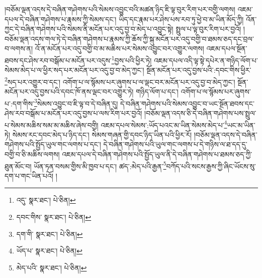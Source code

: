 །བཅོམ་ལྡན་འདས་དེ་བཞིན་གཤེགས་པའི་སེམས་འབྱུང་བའི་མཚན་ཉིད་ཇི་ལྟ་བུར་རིག་པར་བགྱི་ལགས། འཇམ་དཔལ་དེ་བཞིན་གཤེགས་པ་རྣམས་ཀྱི་སེམས་དང་། ཡིད་དང་རྣམ་པར་ཤེས་པས་རབ་ཏུ་ཕྱེ་བ་མ་ཡིན་མོད་ཀྱི། འོན་ཀྱང་དེ་བཞིན་གཤེགས་པའི་སེམས་ནི་མངོན་པར་འདུ་བྱ་བ་མེད་པ་འབྱུང་སྟེ། སྤྲུལ་པ་ལྟ་བུར་རིག་པར་བྱའོ། །བཅོམ་ལྡན་འདས་གལ་ཏེ་དེ་བཞིན་གཤེགས་པ་རྣམས་ཀྱི་ཆོས་ཀྱི་སྐུ་མངོན་པར་འདུ་བགྱི་བ་ཐམས་ཅད་དང་བྲལ་བ་ལགས་ན། འོ་ན་མངོན་པར་འདུ་བགྱི་བ་མ་མཆིས་པར་སེམས་འབྱུང་བར་འགྱུར་ལགས། འཇམ་དཔལ་སྔོན་ཐབས་དང་ཤེས་རབ་བསྒོམ་པ་མངོན་པར་འདུས་\footnote{འདུ་  སྣར་ཐང་།  པེ་ཅིན། }བྱས་པའི་ཕྱིར་ཏེ། འཇམ་དཔལ་འདི་ལྟ་སྟེ་དཔེར་ན་གཉིད་ལོག་པ་སེམས་མེད་པ་ལ་ཕྱིར་སད་པར་མངོན་པར་འདུ་བྱ་བ་མེད་ཀྱང་། སྔོན་མངོན་པར་འདུ་བྱས་པའི་:དབང་གིས་ཕྱིར་\footnote{དབང་གིས་  སྣར་ཐང་།  པེ་ཅིན། }སད་པར་འགྱུར་བ་དང་། འགོག་པ་ལ་སྙོམས་པར་ཞུགས་པ་ལ་ལྡང་བར་མངོན་པར་འདུ་བྱ་བ་མེད་ཀྱང་། སྔོན་མངོན་པར་འདུ་བྱས་པའི་དབང་ཁོ་ནས་ལྡང་བར་འགྱུར་ཏེ། གཉིད་ལོག་པ་དང་། འགོག་པ་ལ་སྙོམས་པར་ཞུགས་པ་:དག་གིས་\footnote{དག་གི་  སྣར་ཐང་།  པེ་ཅིན། }སེམས་འབྱུང་བ་ཇི་ལྟ་བ་དེ་བཞིན་དུ། དེ་བཞིན་གཤེགས་པའི་སེམས་འབྱུང་བ་ཡང་སྔོན་ཐབས་དང་ཤེས་རབ་བསྒོམ་པ་མངོན་པར་འདུ་བྱས་པ་ལས་རིག་པར་བྱའོ། །བཅོམ་ལྡན་འདས་ཅི་དེ་བཞིན་གཤེགས་པས་སྤྲུལ་པ་སེམས་མཆིས་སམ་མ་མཆིས་ཞེས་བགྱི། འཇམ་དཔལ་སེམས་:ཡོད་པའང་མ་ཡིན་སེམས་མེད་པ་\footnote{ཡོད་པ་  སྣར་ཐང་།  པེ་ཅིན། }ཡང་མ་ཡིན་ཏེ། སེམས་རང་དབང་མེད་པ་ཉིད་དང་། སེམས་གཞན་གྱི་དབང་ཉིད་ཡིན་པའི་ཕྱིར་རོ། །བཅོམ་ལྡན་འདས་དེ་བཞིན་གཤེགས་པའི་སྤྱོད་ཡུལ་གང་ལགས་པ་དང་། དེ་བཞིན་གཤེགས་པའི་ཡུལ་གང་ལགས་པ་དེ་གཉིས་ལ་ཐ་དད་དུ་བགྱི་བ་ཅི་མཆིས་ལགས། འཇམ་དཔལ་དེ་བཞིན་གཤེགས་པའི་སྤྱོད་ཡུལ་ནི་དེ་བཞིན་གཤེགས་པ་ཐམས་ཅད་ཀྱི་ཐུན་མོང་བ། ཡོན་ཏན་བསམ་གྱིས་མི་ཁྱབ་པ་དང་། ཚད་:མེད་པའི་རྒྱན་\footnote{མེད་པའི་  སྣར་ཐང་།  པེ་ཅིན། }བཀོད་པའི་སངས་རྒྱས་ཀྱི་ཞིང་ཡོངས་སུ་དག་པ་གང་ཡིན་པའོ། །
